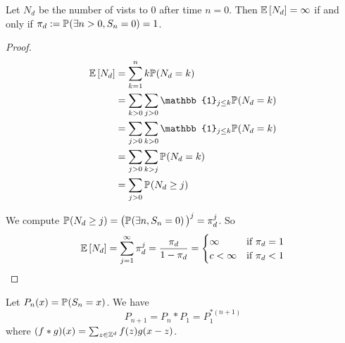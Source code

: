     \begin{claim}
        Let $N_d$ be the number of vists to $0$ after time $n = 0$.
        Then $\E{N_d} = \infty$ if and only if
         $\pi_d := \P{\exists n > 0, S_n = 0} = 1$.
    \end{claim}

    \begin{proof}
        \begin{align*}
            \E{N_d} &=
            \sum_{k=1}^n k \P{N_d = k}
            \\&=
            \sum_{k > 0} \sum_{j > 0} \mathbb{1}_{j \leq k}
                \P{N_d = k}
            \\&=
            \sum_{j > 0} \sum_{k > 0} \mathbb{1}_{j \leq k}
                \P{N_d = k}
            \\&=
            \sum_{j > 0} \sum_{k > j} \P{N_d = k}
            \\&=
            \sum_{j > 0} \P{N_d \geq j}
        \end{align*}

        We compute $\P{N_d \geq j} = \bigparenthesis{
            \P{\exists n, S_n = 0}
        }^j = \pi_d^j$.
        So \begin{align*}
            \E{N_d} = \sum_{j = 1}^\infty \pi_d^j = \frac{\pi_d}{1 - \pi_d}
            = \begin{cases}
                \infty & \tif \pi_d = 1 \\
                c < \infty & \tif \pi_d < 1
            \end{cases}
        \end{align*}
    \end{proof}

    \begin{claim}
        Let $P_n(x) = \P{S_n = x}$.
        We have
        \[
            P_{n+1} = P_n * P_1 = P_1^{*(n+1)}
        \]
        where $(f * g)(x) = \sum_{z \in \Z^d} f(z)g(x - z)$.
    \end{claim}

